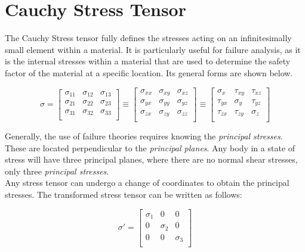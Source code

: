 \documentclass[../main.tex]{subfiles}
\begin{document}
\section{Cauchy Stress Tensor \cite{cauchy}} \label{appendix:cauchy}
The Cauchy Stress tensor fully defines the stresses acting on an infinitesimally small element within a material. It is particularly useful for failure analysis, as it is the internal stresses within a material that are used to determine the safety factor of the material at a specific location. Its general forms are shown below.
\begin{center}
	\begin{equation}
	\sigma = \left[{{
			\begin{matrix}
			\sigma _{{11}}&\sigma _{{12}}&\sigma _{{13}}\\
			\sigma _{{21}}&\sigma _{{22}}&\sigma _{{23}}\\
			\sigma _{{31}}&\sigma _{{32}}&\sigma _{{33}}\\
			\end{matrix}}}\right]
	\equiv \left[{{
			\begin{matrix}
			\sigma _{{xx}}&\sigma _{{xy}}&\sigma _{{xz}}\\
			\sigma _{{yx}}&\sigma _{{yy}}&\sigma _{{yz}}\\
			\sigma _{{zx}}&\sigma _{{zy}}&\sigma _{{zz}}\\
			\end{matrix}}}\right]
	\equiv \left[{{
			\begin{matrix}
			\sigma _{{x}}&\tau _{{xy}}&\tau _{{xz}}\\
			\tau _{{yx}}&\sigma _{{y}}&\tau _{{yz}}\\
			\tau _{{zx}}&\tau _{{zy}}&\sigma _{{z}}\\
			\end{matrix}}}\right]
	\end{equation}
\end{center}

Generally, the use of failure theories requires knowing the \textit{principal stresses}. These are located perpendicular to the \textit{principal planes}. Any body in a state of stress will have three principal planes, where there are no normal shear stresses, only three \textit{principal stresses}.\\

Any stress tensor can undergo a change of coordinates to obtain the principal stresses. The transformed stress tensor can be written as follows:
\begin{center}
	\begin{equation}
	\sigma '= \left[{{
			\begin{matrix}
			\sigma _{{1}}&0&0\\
			0&\sigma _{{2}}&0\\
			0&0&\sigma _{{3}}\\
			\end{matrix}}}\right]
	\end{equation}
\end{center}
\end{document}
